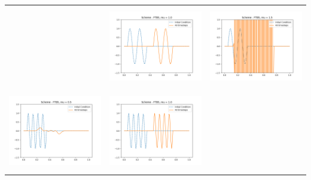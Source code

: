 \documentclass[a4paper,twoside,11pt]{article}
\begin{document}
\begin{table}[!h]
\begin{tabular}{ | c | m{5cm} | m{5cm} | }
\begin{minipage}{.3\textwidth}
          \end{minipage}
          &
          \begin{minipage}{.3\textwidth}
            \includegraphics[width=\linewidth, height=3.5cm]{../plots/scheme3-IC2-mu1_0.png}
          \end{minipage}
          &
          \begin{minipage}{.3\textwidth}
            \includegraphics[width=\linewidth, height=3.5cm]{../plots/scheme3-IC2-mu1_5.png}
          \end{minipage} \\
          \begin{minipage}{.3\textwidth}
            \includegraphics[width=\linewidth, height=3.5cm]{../plots/scheme3-IC3-mu0_5.png}
          \end{minipage}
          &
          \begin{minipage}{.3\textwidth}
            \includegraphics[width=\linewidth, height=3.5cm]{../plots/scheme3-IC3-mu1_0.png}
          \end{minipage}

\end{tabular}
\end{table}
\end{document}
